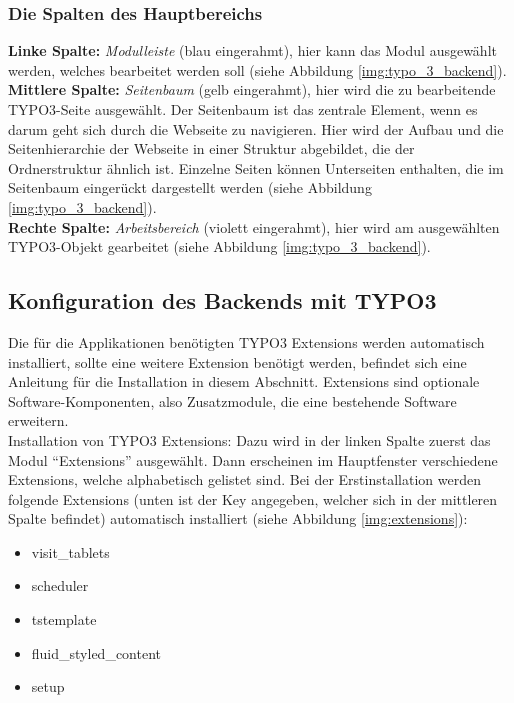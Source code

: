 \subsubsection{Die Spalten des Hauptbereichs}

\textbf{Linke Spalte:} \textit{Modulleiste} (blau eingerahmt), hier kann das Modul ausgewählt werden, welches bearbeitet werden soll (siehe Abbildung \ref{img:typo_3_backend}).\\

\textbf{Mittlere Spalte:} \textit{Seitenbaum} (gelb eingerahmt), hier wird die zu bearbeitende TYPO3-Seite ausgewählt. Der Seitenbaum ist das zentrale Element, wenn es darum geht sich durch die Webseite zu navigieren. Hier wird der Aufbau und die Seitenhierarchie der Webseite in einer Struktur abgebildet, die der Ordnerstruktur ähnlich ist. Einzelne Seiten können Unterseiten enthalten, die im Seitenbaum eingerückt dargestellt werden (siehe Abbildung \ref{img:typo_3_backend}).\\

\textbf{Rechte Spalte:} \textit{Arbeitsbereich} (violett eingerahmt), hier wird am ausgewählten TYPO3-Objekt gearbeitet (siehe Abbildung \ref{img:typo_3_backend}).

\subsection{Konfiguration des Backends mit TYPO3}

Die für die Applikationen benötigten TYPO3 Extensions werden automatisch installiert, sollte eine weitere Extension benötigt werden, befindet sich eine Anleitung für die Installation in diesem Abschnitt. Extensions sind optionale Software-Komponenten, also Zusatzmodule, die eine bestehende Software erweitern.\\
Installation von TYPO3 Extensions: Dazu wird in der linken Spalte zuerst das Modul “Extensions” ausgewählt. Dann erscheinen im Hauptfenster verschiedene Extensions, welche alphabetisch gelistet sind. Bei der Erstinstallation werden folgende Extensions (unten ist der Key angegeben, welcher sich in der mittleren Spalte befindet) automatisch installiert (siehe Abbildung \ref{img:extensions}):

\begin{itemize}
    \item visit\_tablets
    \item scheduler
    \item tstemplate
    \item fluid\_styled\_content
    \item setup
\end{itemize}


